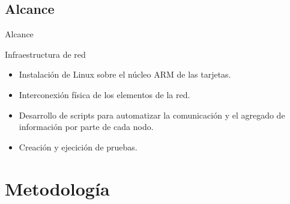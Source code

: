 \documentclass[aspectratio=169]{beamer}
\begin{document}
\subsection{Alcance}
\begin{frame}{Alcance}
\begin{block}{Infraestructura de red}
	\begin{itemize}
		\item Instalación de Linux sobre el núcleo ARM de las tarjetas.
		\item Interconexión física de los elementos de la red.
		\item Desarrollo de scripts para automatizar la comunicación y el agregado de información por parte de cada nodo.
		\item Creación y ejecición de pruebas.
	\end{itemize}
\end{block}
\end{frame}

\section{Metodología}
\end{document}
